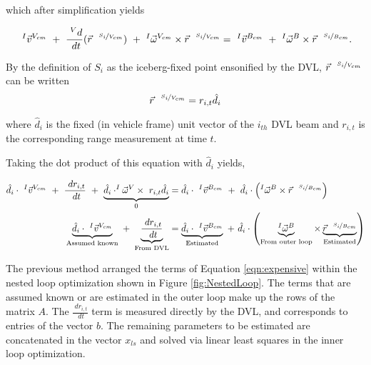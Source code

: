   which after simplification yields 
   
       \begin{equation}
    ~^{I}\vec{v}^{V_{cm}} ~+~ \frac{~^Vd}{~dt}(\vec{r}^{~~\nicefrac{S_i}{V_{cm}}} ) ~+~ ^{I}\vec{\omega}^{V_{cm}}\times\vec{r}^{~~\nicefrac{S_i}{V_{cm}}}  = 
    ~^{I}\vec{v}^{B_{cm}} ~+~^{I}\vec{\omega}^{B}\times\vec{r}^{~~\nicefrac{S_i}{B_{cm}}}. \\
\end{equation}

By the definition of $S_i$ as the iceberg-fixed point ensonified by the DVL,  $\vec{r}^{~~\nicefrac{S_i}{V_{cm}}}$ can be written 
\begin{equation}
\vec{r}^{~~\nicefrac{S_i}{V_{cm}}}= r_{i,t}\hat{d}_{i}  
\label{eqn:SiDef}
\end{equation}

where $\hat{d}_{i} $ is the fixed (in vehicle frame) unit vector of the $i_{th}$ DVL beam and $r_{i,t} $ is the corresponding range measurement at time $t$.  

Taking the dot product of this equation with $\hat{d}_{i} $ yields,

    \begin{align}
    \hat{d}_{i} \cdot~^{I}\vec{v}^{V_{cm}} ~+~ \frac{~dr_{i,t}}{~dt}  ~+~ \underbrace{\hat{d}_{i} \cdot^{I}\vec{\omega}^{V}\times{~r_{i,t}\hat{d}_{i}}}_{0}  &=
     \label{eqn:expensive}
    \hat{d}_{i} \cdot~^{I}\vec{v}^{B_{cm}} ~ + ~\hat{d}_{i} \cdot\left(^{I}\vec{\omega}^{B}\times\vec{r}^{~~\nicefrac{S_i}{B_{cm}}}\right)  \\
    \underbrace{\hat{d}_{i} \cdot~^{I}\vec{v}^{V_{cm}}}_{\text{Assumed known}} ~+~ \underbrace{\frac{~dr_{i,t}}{~dt} }_{\text{From DVL}}  &=
    \underbrace{\hat{d}_{i} \cdot~^{I}\vec{v}^{B_{cm}}}_{\text{Estimated}} ~ + ~\hat{d}_{i} \cdot\left(\underbrace{^{I}\vec{\omega}^{B}}_{\text{From outer loop}}\times\underbrace{\vec{r}^{~~\nicefrac{S_i}{B_{cm}}}}_{\text{Estimated}}\right)  
         \label{eqn:expensive2}
\end{align}

The previous method arranged the terms of Equation \ref{eqn:expensive} within the nested loop optimization shown in Figure \ref{fig:NestedLoop}. The terms that are assumed known or are estimated in the outer loop make up the rows of the matrix $A$. The $\frac{~dr_{i,t}}{~dt}$ term is measured directly by the DVL, and corresponds to entries of the vector $b$. The remaining parameters to be estimated are concatenated in the vector $x_{ls}$ and solved via linear least squares in the inner loop optimization. 

